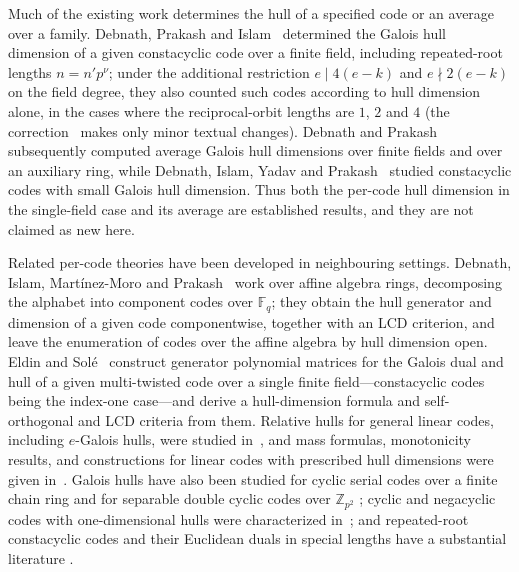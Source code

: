 \documentclass[11pt]{article}
\theoremstyle{definition}
\theoremstyle{remark}
\newcommand{\Fq}{\mathbb{F}_q}
\begin{document}
Much of the existing work determines the hull of a specified code or
an average over a family. Debnath, Prakash and Islam~\cite{DPI2023}
determined the Galois hull dimension of a given constacyclic code over
a finite field, including repeated-root lengths \(n = n' p^{\nu}\);
under the additional restriction \(e \mid 4(e-k)\) and
\(e \nmid 2(e-k)\) on the field degree, they also counted such codes
according to hull dimension alone, in the cases where the
reciprocal-orbit lengths are \(1\), \(2\) and \(4\) (the
correction~\cite{DPI2023corr} makes only minor textual changes).
Debnath and Prakash~\cite{DP2025} subsequently computed average
Galois hull dimensions over finite fields and over an auxiliary ring,
while Debnath, Islam, Yadav and Prakash~\cite{DIYP2026} studied
constacyclic codes with small Galois hull dimension. Thus both the
per-code hull dimension in the single-field case and its average are
established results, and they are not claimed as new here.

Related per-code theories have been developed in neighbouring
settings. Debnath, Islam, Mart\'inez-Moro and
Prakash~\cite{DIMP2026} work over affine algebra rings, decomposing
the alphabet into component codes over \(\Fq\); they obtain the hull
generator and dimension of a given code componentwise, together with
an LCD criterion, and leave the enumeration of codes over the
affine algebra by hull dimension open. Eldin and
Sol\'e~\cite{ES2026} construct generator polynomial matrices for the
Galois dual and hull of a given multi-twisted code over a single
finite field---constacyclic codes being the index-one case---and
derive a hull-dimension formula and self-orthogonal and LCD criteria
from them. Relative hulls for general linear codes, including
\(e\)-Galois hulls, were studied in~\cite{ACLMRS2024}, and mass
formulas, monotonicity results, and constructions for linear codes
with prescribed hull dimensions were given
in~\cite{LS2024, LSL2025, BBO2026, LYW2025}. Galois hulls have also
been studied for cyclic serial codes over a finite chain ring
\cite{Talbi2021} and for separable double cyclic codes over
\(\mathbb{Z}_{p^2}\) \cite{DPDC2025}; cyclic and negacyclic codes with
one-dimensional hulls were characterized in~\cite{DS2024}; and
repeated-root constacyclic codes and their Euclidean duals in special
lengths have a substantial literature
\cite{CDL2015, Sharma2015, WZLL2023, ZWLL2025}.
\end{document}
